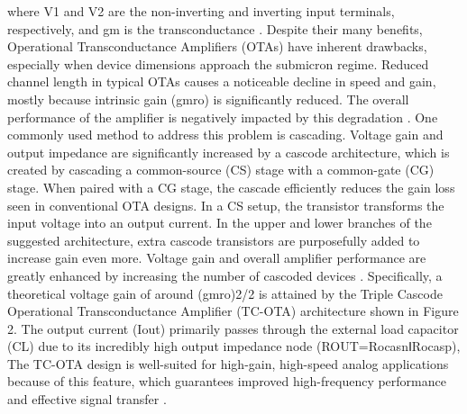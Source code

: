 where V1 and V2 are the non-inverting and inverting input terminals,
respectively, and gm is the transconductance \cite{ref6}.
Despite their many benefits, Operational Transconductance Amplifiers (OTAs) have
inherent drawbacks, especially when device dimensions approach the submicron
regime. Reduced channel length in typical OTAs causes a noticeable decline in
speed and gain, mostly because intrinsic gain (gmro) is significantly reduced.
The overall performance of the amplifier is negatively impacted by this
degradation \cite{ref4,ref7}. One commonly used method to address this problem
is cascading. Voltage gain and output impedance are significantly increased by a
cascode architecture, which is created by cascading a common-source (CS) stage
with a common-gate (CG) stage. When paired with a CG stage, the cascade
efficiently reduces the gain loss seen in conventional OTA designs. In a CS
setup, the transistor transforms the input voltage into an output current. In
the upper and lower branches of the suggested architecture, extra cascode
transistors are purposefully added to increase gain even more. Voltage gain and
overall amplifier performance are greatly enhanced by increasing the number of
cascoded devices \cite{ref28}. Specifically, a theoretical voltage gain of
around (gmro)2/2 is attained by the Triple Cascode Operational Transconductance
Amplifier (TC-OTA) architecture shown in Figure 2. The output current (Iout)
primarily passes through the external load capacitor (CL) due to its incredibly
high output impedance node (ROUT=RocasnǁRocasp), The TC-OTA design is
well-suited for high-gain, high-speed analog applications because of this
feature, which guarantees improved high-frequency performance and effective
signal transfer \cite{ref36}.

